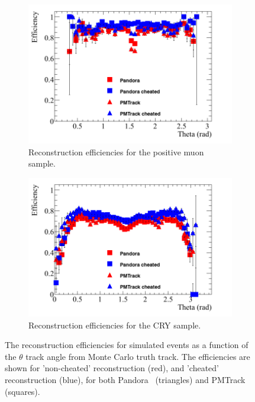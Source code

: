 \begin{figure}
  \centering
  \begin{subfigure}{0.48\textwidth}
    \centering
    \includegraphics[width=\textwidth]{Effic_AntiMuon_500V_All_Theta}
    \caption{Reconstruction efficiencies for the positive muon sample.}
    \label{fig:SimEffic_Theta_AMu}
  \end{subfigure}%
  \hspace{0.03\textwidth}%
  \begin{subfigure}{0.48\textwidth}
    \centering
    \includegraphics[width=\textwidth]{Effic_Cosmics_500V_All_Theta}
    \caption{Reconstruction efficiencies for the CRY sample.}
    \label{fig:SimEffic_Theta_CRY}
  \end{subfigure}
  \caption[The reconstruction efficiencies for simulated events as a function of the $\theta$ track angle from Monte Carlo truth track.]
          {The reconstruction efficiencies for simulated events as a function of the $\theta$ track angle from Monte Carlo truth track. The efficiencies are shown for 'non-cheated' reconstruction (red), and 'cheated' reconstruction (blue), for both Pandora~\citep{Pandora} (triangles) and PMTrack~\citep{PMTrack} (squares).}
          \label{fig:SimEffic_Theta}
\end{figure}

